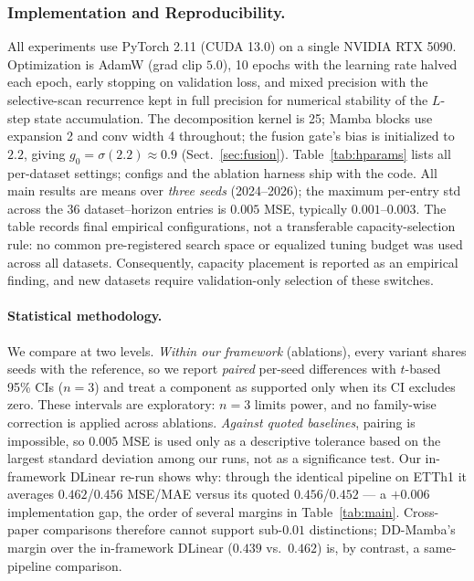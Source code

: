 \documentclass[runningheads]{llncs}
\newcommand{\model}{DD-Mamba}
\begin{document}
\subsubsection{Implementation and Reproducibility.}
\label{sec:repro}
All experiments use PyTorch 2.11 (CUDA 13.0) on a single NVIDIA RTX 5090.
Optimization is AdamW (grad clip $5.0$), 10 epochs with the learning rate
halved each epoch, early stopping on validation loss, and mixed precision
with the selective-scan recurrence kept in full precision for numerical
stability of the $L$-step state accumulation. The decomposition kernel is
25; Mamba blocks use expansion 2 and conv width 4 throughout; the fusion
gate's bias is initialized to $2.2$, giving $g_0 = \sigma(2.2) \approx 0.9$
(Sect.~\ref{sec:fusion}). Table~\ref{tab:hparams} lists all per-dataset settings; configs
and the ablation harness ship with the code. All main results are means
over \emph{three seeds} (2024--2026); the maximum per-entry std across the
36 dataset--horizon entries is $0.005$ MSE, typically $0.001$--$0.003$.
The table records final empirical configurations, not a transferable
capacity-selection rule: no common pre-registered search space or equalized
tuning budget was used across all datasets. Consequently, capacity placement
is reported as an empirical finding, and new datasets require
validation-only selection of these switches.
\paragraph{Statistical methodology.} We compare at two levels.
\emph{Within our framework} (ablations), every variant shares seeds with
the reference, so we report \emph{paired} per-seed differences with
$t$-based 95\% CIs ($n{=}3$) and treat a component as supported only when
its CI excludes zero. These intervals are exploratory: $n{=}3$ limits power,
and no family-wise correction is applied across ablations.
\emph{Against quoted baselines}, pairing is impossible, so $0.005$ MSE is
used only as a descriptive tolerance based on the largest standard deviation
among our runs, not as a significance test. Our in-framework DLinear re-run
shows why: through the identical
pipeline on ETTh1 it averages $0.462$/$0.456$ MSE/MAE versus its quoted
$0.456$/$0.452$ --- a $+0.006$ implementation gap, the order of several
margins in Table~\ref{tab:main}. Cross-paper comparisons therefore cannot
support sub-$0.01$ distinctions; \model{}'s margin over the in-framework
DLinear ($0.439$ vs.\ $0.462$) is, by contrast, a same-pipeline comparison.
\end{document}
